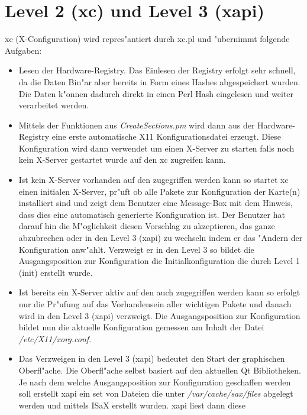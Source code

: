 \section{Level 2 (xc) und Level 3 (xapi)}
\label{sec:le2}
xc (X-Configuration) wird repres"antiert durch xc.pl und 
"ubernimmt folgende Aufgaben:
\begin{itemize}
\item Lesen der Hardware-Registry. Das Einlesen der Registry
      erfolgt sehr schnell, da die Daten Bin"ar aber bereits 
      in Form eines Hashes abgespeichert wurden. Die Daten 
      k"onnen dadurch direkt in einen Perl Hash eingelesen und
      weiter verarbeitet werden.
\item Mittels der Funktionen aus \textit{CreateSections.pm} 
      wird dann aus der Hardware-Registry eine erste automatische 
      X11 Konfigurationsdatei erzeugt. Diese Konfiguration wird
      dann verwendet um einen X-Server zu starten falls noch kein
      X-Server gestartet wurde auf den xc zugreifen kann.
\item Ist kein X-Server vorhanden auf den zugegriffen werden kann
      so startet xc einen initialen X-Server, pr"uft ob alle Pakete
      zur Konfiguration der Karte(n) installiert sind und zeigt dem 
      Benutzer eine Message-Box mit dem Hinweis, dass dies eine automatisch
      generierte Konfiguration ist. Der Benutzer hat darauf hin die
      M"oglichkeit diesen Vorschlag zu akzeptieren, das ganze
      abzubrechen oder in den Level 3 (xapi) zu wechseln indem
      er das "Andern der Konfiguration anw"ahlt. Verzweigt er in 
      den Level 3 so bildet die Ausgangsposition zur Konfiguration
      die Initialkonfiguration die durch Level 1 (init) erstellt 
      wurde.
\item Ist bereits ein X-Server aktiv auf den auch zugegriffen werden
      kann so erfolgt nur die Pr"ufung auf das Vorhandensein aller
      wichtigen Pakete und danach wird in den Level 3 (xapi)
      verzweigt. Die Ausgangsposition zur Konfiguration bildet nun
      die aktuelle Konfiguration gemessen am Inhalt der Datei
      \textit{/etc/X11/xorg.conf}.
\item Das Verzweigen in den Level 3 (xapi) bedeutet den Start der 
      graphischen Oberfl"ache. Die Oberfl"ache selbst basiert auf
      den aktuellen Qt Bibliotheken. Je nach dem welche Ausgangsposition
      zur Konfiguration geschaffen werden soll erstellt xapi ein
      set von Dateien die unter \textit{/var/cache/sax/files} abgelegt
      werden und mittels ISaX erstellt wurden. xapi liest dann diese

\end{itemize}
